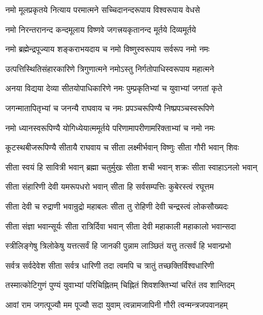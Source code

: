 

\addtocounter{shlokacount}{23}


\twolineshloka
{नमो मूलप्रकृतये नित्याय परमात्मने}
{सच्चिदानन्दरूपाय विश्वरूपाय वेधसे} %

\twolineshloka
{नमो निरन्तरानन्द कन्दमूलाय विष्णवे}
{जगत्त्रयकृतानन्द मूर्तये दिव्यमूर्तये} %

\twolineshloka
{नमो ब्रह्मेन्द्रपूज्याय शङ्कराभयदाय च}
{नमो विष्णुस्वरूपाय सर्वरूप नमो नमः} %

\twolineshloka
{उत्पत्तिस्थितिसंहारकारिणे त्रिगुणात्मने}
{नमोऽस्तु निर्गतोपाधिस्वरूपाय महात्मने} %

\twolineshloka
{अनया विद्यया देव्या सीतयोपाधिकारिणे}
{नमः पुम्प्रकृतिभ्यां च युवाभ्यां जगतां कृते} %

\twolineshloka
{जगन्मातापितृभ्यां च जनन्यै राघवाय च}
{नमः प्रपञ्चरूपिण्यै निष्प्रपञ्चस्वरूपिणे} %

\twolineshloka
{नमो ध्यानस्वरूपिण्यै योगिध्येयात्ममूर्तये}
{परिणामापरीणामरिक्ताभ्यां च नमो नमः} %

\twolineshloka
{कूटस्थबीजरूपिण्यै सीतायै राघवाय च}
{सीता लक्ष्मीर्भवान् विष्णुः सीता गौरी भवान् शिवः} %

\twolineshloka
{सीता स्वयं हि सावित्री भवान् ब्रह्मा चतुर्मुखः}
{सीता शची भवान् शक्रः सीता स्वाहाऽनलो भवान्} %

\twolineshloka
{सीता संहारिणी देवी यमरूपधरो भवान्}
{सीता हि सर्वसम्पत्तिः कुबेरस्त्वं रघूत्तम} %

\twolineshloka
{सीता देवी च रुद्राणी भवान्रुद्रो महाबलः}
{सीता तु रोहिणी देवी चन्द्रस्त्वं लोकसौख्यदः} %

\twolineshloka
{सीता संज्ञा भवान्सूर्यः सीता रात्रिर्दिवा भवान्}
{सीता देवी महाकाली महाकालो भवान्सदा} %

\twolineshloka
{स्त्रीलिङ्गेषु त्रिलोकेषु यत्तत्सर्वं हि जानकी}
{पुन्नाम लाञ्छितं यत्तु तत्सर्वं हि भवान्प्रभो} %

\twolineshloka
{सर्वत्र सर्वदेवेश सीता सर्वत्र धारिणी}
{तदा त्वमपि च त्रातुं तच्छक्तिर्विश्वधारिणी} %

\twolineshloka
{तस्मात्कोटिगुणं पुण्यं युवाभ्यां परिचिह्नितम्}
{चिह्नितं शिवशक्तिभ्यां चरितं तव शान्तिदम्} %

\twolineshloka
{आवां राम जगत्पूज्यौ मम पूज्यौ सदा युवाम्}
{त्वन्नामजापिनी गौरी त्वन्मन्त्रजपवानहम्} %

